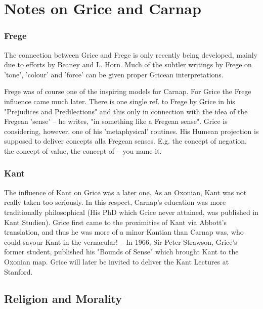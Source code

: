 \documentclass[10pt,titlepage]{book}
\begin{document}
\chapter{Notes on Grice and Carnap}

\subsection{Frege}

The connection between Grice and Frege is only recently being  
developed, mainly due to efforts by Beaney and L. Horn. Much of the subtler  
writings by Frege on 'tone', 'colour' and 'force' can be given proper Gricean  
interpretations.
 
Frege was of course one of the inspiring models for Carnap. For  Grice 
the Frege influence came much later. There is one single ref. to Frege by  
Grice in his "Prejudices and Predilections" and this only in connection with 
the  idea of the Fregean 'sense' -- he writes, "in something like a Fregean 
sense".  Grice is considering, however, one of his 'metaphysical' routines. 
His Humean  projection is supposed to deliver concepts alla Fregean senses. 
E.g. the concept  of negation, the concept of value, the concept of -- you 
name it.
 
\subsection{Kant}

The influence of Kant on Grice was a later one. As an Oxonian, Kant was 
 not really taken too seriously. In this respect, Carnap's education was 
more  traditionally philosophical (His PhD which Grice never attained, was 
published  in Kant Studien). Grice first came to the proximities of Kant via 
Abbott's  translation, and thus he was more of a minor Kantian than Carnap 
was, who could  savour Kant in the vernacular! -- In 1966, Sir Peter Strawson, 
Grice's former  student, published his "Bounds of Sense" which brought Kant 
to the Oxonian map.  Grice will later be invited to deliver the Kant 
Lectures at Stanford.
 
\section{Religion and Morality}
\end{document}
